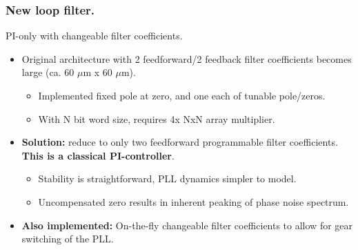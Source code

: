 \documentclass[t, screen, aspectratio=43]{beamer}
\begin{document}
\begin{frame}
	\frametitle{New loop filter.}
	\begin{block}{PI-only with changeable filter coefficients.}
		\begin{minipage}{6cm}
			\vspace{1em}
			\tiny

			\begin{itemize}[itemsep=4pt,label=\protect---]
				\item Original architecture with 2 feedforward/2 feedback filter coefficients becomes large (ca. 60 $\mu$m x 60 $\mu$m).
				\begin{itemize}[itemsep=4pt,label=\protect$\bullet$]
						\item Implemented fixed pole at zero, and one each of tunable pole/zeros.
						\item With N bit word size, requires 4x NxN array multiplier.
				\end{itemize}
				\item {\color{red}\textbf{Solution:}} reduce to only two feedforward programmable filter coefficients. \textbf{This is a classical PI-controller}.
				\begin{itemize}[itemsep=4pt,label=\protect$\bullet$]
						\item Stability is straightforward, PLL dynamics simpler to model.
						\item Uncompensated zero results in inherent peaking of phase noise spectrum.
				\end{itemize}
				\item \textbf{Also implemented:} On-the-fly changeable filter coefficients to allow for gear switching of the PLL.
			\end{itemize}


\end{minipage}
\end{block}
\end{frame}
\end{document}
